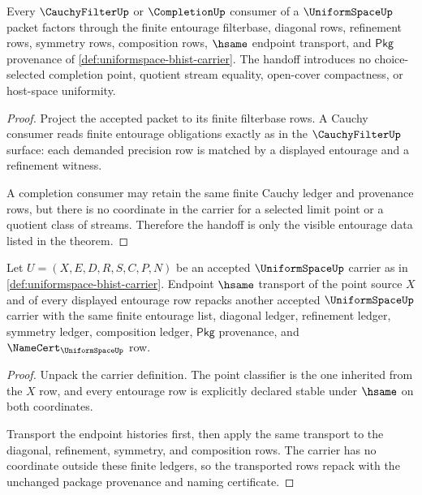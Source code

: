 \begin{theorem}
\label{thm:uniformspace-cauchy-completion-handoff}
Every $\CauchyFilterUp$ or $\CompletionUp$ consumer of a
$\UniformSpaceUp$ packet factors through the finite entourage filterbase,
diagonal rows, refinement rows, symmetry rows, composition rows, $\hsame$
endpoint transport, and $\mathsf{Pkg}$ provenance of
\autoref{def:uniformspace-bhist-carrier}. The handoff introduces no
choice-selected completion point, quotient stream equality, open-cover
compactness, or host-space uniformity.
\end{theorem}
\begin{proof}
Project the accepted packet to its finite filterbase rows. A Cauchy consumer
reads finite entourage obligations exactly as in the $\CauchyFilterUp$ surface:
each demanded precision row is matched by a displayed entourage and a
refinement witness.

A completion consumer may retain the same finite Cauchy ledger and provenance
rows, but there is no coordinate in the carrier for a selected limit point or
a quotient class of streams. Therefore the handoff is only the visible
entourage data listed in the theorem.
\end{proof}

\begin{theorem}
\label{thm:uniformspace-classifier-transport-obligation}
Let $U=(X,E,D,R,S,C,P,N)$ be an accepted $\UniformSpaceUp$ carrier as in
\autoref{def:uniformspace-bhist-carrier}. Endpoint $\hsame$ transport of the
point source $X$ and of every displayed entourage row repacks another accepted
$\UniformSpaceUp$ carrier with the same finite entourage list, diagonal
ledger, refinement ledger, symmetry ledger, composition ledger,
$\mathsf{Pkg}$ provenance, and $\NameCert_{\UniformSpaceUp}$ row.
\end{theorem}
\begin{proof}
Unpack the carrier definition. The point classifier is the one inherited from
the $X$ row, and every entourage row is explicitly declared stable under
$\hsame$ on both coordinates.

Transport the endpoint histories first, then apply the same transport to the
diagonal, refinement, symmetry, and composition rows. The carrier has no
coordinate outside these finite ledgers, so the transported rows repack with
the unchanged package provenance and naming certificate.
\end{proof}

